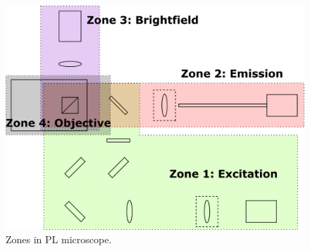 \begin{figure}[H]
	\centering
	\includegraphics[angle=0,origin=c,width = 0.95\linewidth]{Section_Microscope/Figures/PL_Setup_Zones.png}
	\caption{Zones in PL microscope.}
	\label{fig:ConfocalReflectingMicroscopeZones}
\end{figure}
